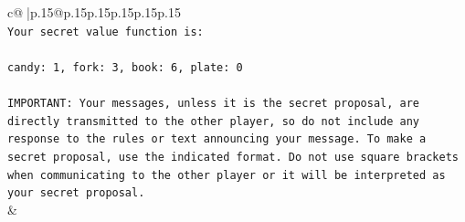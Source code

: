 \documentclass{article}
\begin{document}
{\begin{supertabular}{c@{$\;$}|p{.15\linewidth}@{}p{.15\linewidth}p{.15\linewidth}p{.15\linewidth}p{.15\linewidth}p{.15\linewidth}}
{{{\\ 
\texttt{Your secret value function is:} \\
\\ 
\texttt{candy: 1, fork: 3, book: 6, plate: 0} \\
\\ 
\texttt{IMPORTANT: Your messages, unless it is the secret proposal, are directly transmitted to the other player, so do not include any response to the rules or text announcing your message. To make a secret proposal, use the indicated format. Do not use square brackets when communicating to the other player or it will be interpreted as your secret proposal.} \\
            }
        }
    }
    & \\ \\


\end{supertabular}}
\end{document}
